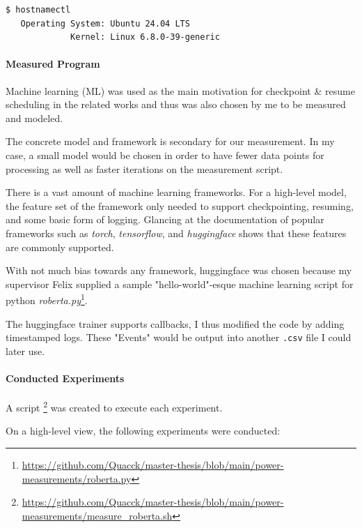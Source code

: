 \begin{lstlisting}[language=bash, frame=single, numbers=none, caption={Used operating system information}, basicstyle=\ttfamily]
    $ hostnamectl 
   Operating System: Ubuntu 24.04 LTS                
             Kernel: Linux 6.8.0-39-generic
\end{lstlisting}

\paragraph{Measured Program}

Machine learning (ML) was used as the main motivation for checkpoint \& resume scheduling in the related works\cite {wiesner_lets_2021} and thus was also chosen by me to be measured and modeled. 

The concrete model and framework is secondary for our measurement. In my case, a small model would be chosen in order to have fewer data points for processing as well as faster iterations on the measurement script. 

There is a vast amount of machine learning frameworks. For a high-level model, the feature set of the framework only needed to support checkpointing, resuming, and some basic form of logging. 
Glancing at the documentation of popular frameworks such as \emph{torch}, \emph{tensorflow}, and \emph{huggingface} shows that these features are commonly supported. 

With not much bias towards any framework, huggingface was chosen because my supervisor Felix supplied a sample "hello-world"-esque machine learning script for python \emph{roberta.py}\footnote{\url{https://github.com/Quacck/master-thesis/blob/main/power-measurements/roberta.py}}.

The huggingface trainer supports callbacks, I thus modified the code by adding timestamped logs. These "Events" would be output into another \verb|.csv| file I could later use.

\paragraph{Conducted Experiments}

A script \footnote{\url{https://github.com/Quacck/master-thesis/blob/main/power-measurements/measure_roberta.sh}} was created to execute each experiment. 

On a high-level view, the following experiments were conducted: 


